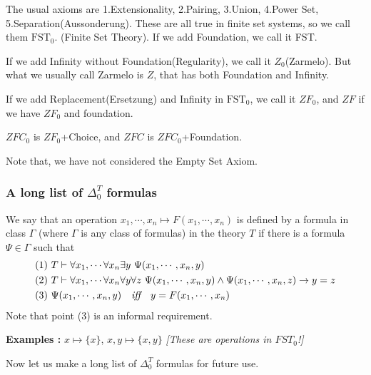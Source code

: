 \documentclass[12pt,a4paper]{article}
\begin{document}
The usual axioms are 1.Extensionality, 2.Pairing, 3.Union, 4.Power Set, 5.Separation(Aussonderung). These are all true in finite set systems, so we call them $\text{FST}_0$. (Finite Set Theory). If we add Foundation, we call it FST.

\quad If we add Infinity without Foundation(Regularity), we call it $Z_0$(Zarmelo). But what we usually call Zarmelo is $Z$, that has both Foundation and Infinity.

\quad If we add Replacement(Ersetzung) and Infinity in $\text{FST}_0$, we call it $ZF_0$, and $ZF$ if we have $ZF_0$ and foundation.

\quad $ZFC_0$ is $ZF_0$+Choice, and $ZFC$ is $ZFC_0$+Foundation.
\s

Note that, we have not considered the Empty Set Axiom.
\s

\subsubsection*{A long list of $\Delta_0^T$ formulas}

We say that an operation $x_1, \cdots, x_n \mapsto F(x_1, \cdots, x_n)$ is defined by a formula in class $\Gamma$ (where $\Gamma$ is any class of formulas) in the theory $T$ if there is a formula $\Psi \in \Gamma$ such that
\begin{align*}
&(1) \,\, T \vdash \forall x_1, \cdots\forall x_n \exists y\,\, \Psi(x_1, \cdots, x_n, y)\\
&(2) \,\, T \vdash \forall x_1, \cdots\forall x_n \forall y \forall z \,\, \Psi(x_1, \cdots, x_n, y) \wedge \Psi(x_1, \cdots, x_n,z) \rightarrow y=z \\
&(3) \,\, \Psi(x_1, \cdots, x_n, y) \quad \textit{iff} \quad y = F(x_1, \cdots, x_n)
\end{align*}
Note that point (3) is an informal requirement.
\s

\textbf{Examples :} $x\mapsto \{x\}$, $x,y \mapsto \{x,y\}$ \emph{[These are operations in $FST_0$!]}
\s

Now let us make a long list of $\Delta_0^T$ formulas for future use.
\end{document}
